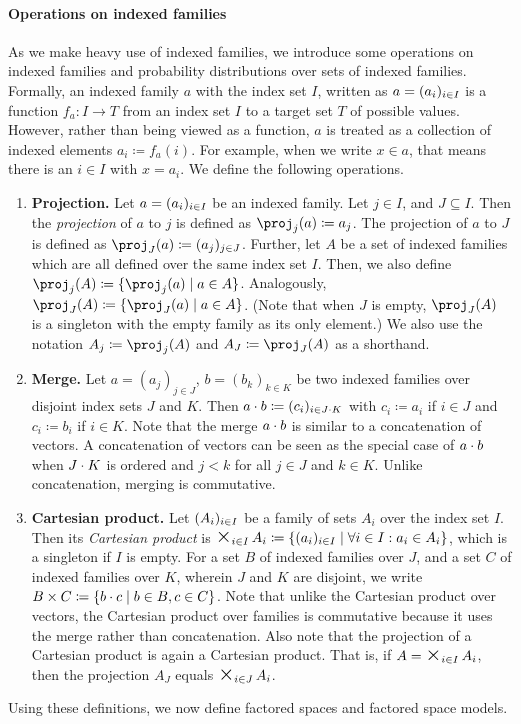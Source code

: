 \documentclass[USenglish,onecolumn]{article}
\begin{document}
\paragraph*{Operations on indexed families}
\label{par:indexedfamilies}
As we make heavy use of indexed families, we introduce some operations on indexed families and probability distributions over sets of indexed families. Formally, an indexed family $a$ with the index set $I$, written as $a=(a_i)_\iinI $ is a function $f_a\colon I\to T$ from an index set $I$ to a target set $T$ of possible values. However, rather than being viewed as a function, $a$ is treated as a collection of indexed elements $a_i \coloneqq f_a(i)$. For example, when we write $x\in a$, that means there is an $i\in I$ with $x=a_i$. We define the following operations.
\begin{enumerate}
    \item \textbf{Projection.}
Let $a=(a_i)_\iinI $ be an indexed family. Let $j\in I$, and $J\subseteq I$.  Then the \textit{projection} of $a$ to $j$ is defined as $\proj_j(a)\coloneqq a_j$. The projection of $a$ to $J$ is defined as $\proj_J(a)\coloneqq (a_j)_{j\in J}$.
%
Further, let $A$ be a set of indexed families which are all defined over the same index set $I$. Then, we also define $\proj_j(A)\coloneqq \{\proj_j(a)\mid a\in A\}$. Analogously, $\proj_J(A)\coloneqq \{\proj_J(a)\mid a\in A\}$. (Note that when $J$ is empty, $\proj_J(A)$ is a singleton with the empty family as its only element.) We also use the notation $A_j\coloneqq \proj_j(A)$ and $A_J\coloneqq \proj_J(A)$ as a shorthand.
\item \textbf{Merge.} Let $a=(a_j)_{j\in J}$, $b=(b_k)_{k\in K}$ be two indexed families over disjoint index sets $J$ and $K$. Then $a\merge b\coloneqq  (c_i)_{i\in J\merge K}$ with $c_i\coloneqq  a_i$ if $i\in J$ and $c_i\coloneqq b_i$ if $i\in K$. Note that the merge $a\merge b$ is similar to a concatenation of vectors. A concatenation of vectors can be seen as the special case of $a\merge b$ when $J\merge K$ is ordered and $j<k$ for all $j\in J$ and $k\in K$. Unlike concatenation, merging is commutative.
\item
\textbf{Cartesian product.} Let $(A_i)_\iinI $ be a family of sets $A_i$ over the index set $I$. Then its \emph{Cartesian product} is $\timesbig_\iinI A_i\coloneqq \{(a_i)_\iinI \mid  \forall i\in I: a_i\in A_i\}$, which is a singleton if $I$ is empty.
For a set $B$ of indexed families over $J$, and a set $C$ of indexed families over $K$, wherein $J$ and $K$ are disjoint, we write $B \times C \coloneqq  \{b \merge c\mid b\in B, c\in C\}$. Note that unlike the Cartesian product over vectors, the Cartesian product over families is  commutative because it uses the merge rather than concatenation. Also note that the projection of a Cartesian product is again a Cartesian product. That is, if $A=\timesbig_\iinI A_i$, then the projection $A_J$ equals $\timesbig_{i\in J}A_i$.
\end{enumerate}
%
Using these definitions, we now define factored spaces and factored space models.
\end{document}
